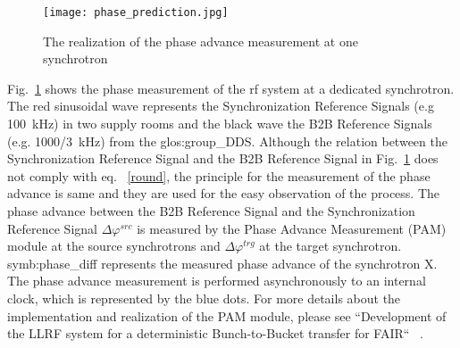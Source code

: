 \begin{figure}[!htb]
   \centering   
   \texttt{[image: phase\_prediction.jpg]}
   \caption{The realization of the phase advance measurement at one synchrotron}
   \label{phase_prediction}
\end{figure}

Fig.~\ref{phase_prediction} shows the phase measurement of the rf system at a dedicated synchrotron. The red sinusoidal wave represents the Synchronization Reference Signals (e.g \SI{100}{kHz}) in two supply rooms and the black wave the B2B Reference Signals (e.g. \SI{1000/3}{kHz}) from the \gls{glos:group_DDS}. Although the relation between the Synchronization Reference Signal and the B2B Reference Signal in Fig.~\ref{phase_prediction} does not comply with eq. ~\ref{round}, the principle for the measurement of the phase advance is same and they are used for the easy observation of the process. The phase advance  between the B2B Reference Signal and the Synchronization Reference Signal $\Delta \varphi^\mathit{src}$ is measured by the Phase Advance Measurement (\gls{PAM}) module at the source synchrotrons and $\Delta \varphi^\mathit{trg}$ at the target synchrotron. \gls{symb:phase_diff} represents the measured phase advance of the synchrotron X. The phase advance measurement is performed asynchronously to an internal clock, which is represented by the blue dots. For more details about the implementation and realization of the PAM module, please see ``Development of the LLRF system for a deterministic Bunch-to-Bucket transfer for FAIR`` ~\cite{ferrand_development_????}. 
